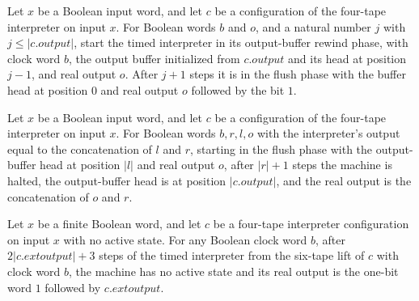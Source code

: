 \begin{lemma}
\label{Turing.timed_output_back}
\leanok
{}
Let $x$ be a Boolean input word, and let $c$ be a configuration of the four-tape
interpreter on input $x$. For Boolean words $b$ and $o$, and a natural number $j$ with
$j\leq |c.output|$, start the timed interpreter in its output-buffer rewind phase, with
clock word $b$, the output buffer initialized from $c.output$ and its head at position
$j-1$, and real output $o$. After $j+1$ steps it is in the flush phase with the buffer
head at position $0$ and real output $o$ followed by the bit $1$.
\end{lemma}

\begin{lemma}
\label{Turing.timed_output_forward}
\leanok
{}
Let $x$ be a Boolean input word, and let $c$ be a configuration of the four-tape
interpreter on input $x$. For Boolean words $b,r,l,o$ with the interpreter’s output
equal to the concatenation of $l$ and $r$, starting in the flush phase with the
output-buffer head at position $|l|$ and real output $o$, after $|r|+1$ steps the
machine is halted, the output-buffer head is at position $|c.output|$, and the real
output is the concatenation of $o$ and $r$.
\end{lemma}

\begin{lemma}
\label{Turing.timed_flush}
\leanok
{}
Let $x$ be a finite Boolean word, and let $c$ be a four-tape interpreter configuration
on input $x$ with no active state. For any Boolean clock word $b$, after
$2|c.	ext{output}|+3$ steps of the timed interpreter from the six-tape lift of $c$ with
clock word $b$, the machine has no active state and its real output is the one-bit word
$1$ followed by $c.	ext{output}$.
\end{lemma}

